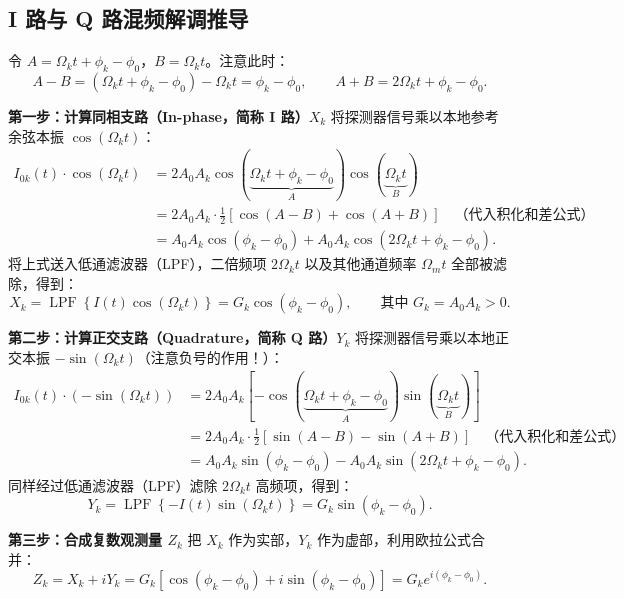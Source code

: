 \documentclass[UTF8, a4paper, 11pt]{ctexart}
\begin{document}
\subsection{I 路与 Q 路混频解调推导}

\begin{derivation}[从混频乘法到复观测量 $Z_k = X_k + iY_k$]
令 $A = \Omega_k t + \phi_k - \phi_0$，$B = \Omega_k t$。注意此时：
\[
    A - B = (\Omega_k t + \phi_k - \phi_0) - \Omega_k t = \phi_k - \phi_0, \qquad A + B = 2\Omega_k t + \phi_k - \phi_0.
\]

\textbf{第一步：计算同相支路（In-phase，简称 I 路）$X_k$}
将探测器信号乘以本地参考余弦本振 $\cos(\Omega_k t)$：
\begin{align*}
    I_{0k}(t) \cdot \cos(\Omega_k t) &= 2A_0 A_k \cos(\underbrace{\Omega_k t + \phi_k - \phi_0}_{A}) \cos(\underbrace{\Omega_k t}_{B}) \\
    &= 2A_0 A_k \cdot \frac{1}{2}\left[ \cos(A - B) + \cos(A + B) \right] \quad \text{（代入积化和差公式）}\\
    &= A_0 A_k \cos(\phi_k - \phi_0) + A_0 A_k \cos(2\Omega_k t + \phi_k - \phi_0).
\end{align*}
将上式送入低通滤波器（LPF），二倍频项 $2\Omega_k t$ 以及其他通道频率 $\Omega_m t$ 全部被滤除，得到：
\[
    X_k = \operatorname{LPF}\left\{ I(t)\cos(\Omega_k t) \right\} = G_k \cos(\phi_k - \phi_0), \qquad \text{其中 } G_k = A_0 A_k > 0.
\]

\textbf{第二步：计算正交支路（Quadrature，简称 Q 路）$Y_k$}
将探测器信号乘以本地正交本振 $-\sin(\Omega_k t)$（注意负号的作用！）：
\begin{align*}
    I_{0k}(t) \cdot \left(-\sin(\Omega_k t)\right) &= 2A_0 A_k \left[ -\cos(\underbrace{\Omega_k t + \phi_k - \phi_0}_{A}) \sin(\underbrace{\Omega_k t}_{B}) \right] \\
    &= 2A_0 A_k \cdot \frac{1}{2}\left[ \sin(A - B) - \sin(A + B) \right] \quad \text{（代入积化和差公式）}\\
    &= A_0 A_k \sin(\phi_k - \phi_0) - A_0 A_k \sin(2\Omega_k t + \phi_k - \phi_0).
\end{align*}
同样经过低通滤波器（LPF）滤除 $2\Omega_k t$ 高频项，得到：
\[
    Y_k = \operatorname{LPF}\left\{ -I(t)\sin(\Omega_k t) \right\} = G_k \sin(\phi_k - \phi_0).
\]

\textbf{第三步：合成复数观测量 $Z_k$}
把 $X_k$ 作为实部，$Y_k$ 作为虚部，利用欧拉公式合并：
\[
    \boxed{
    Z_k = X_k + iY_k = G_k\left[\cos(\phi_k - \phi_0) + i\sin(\phi_k - \phi_0)\right] = G_k e^{i(\phi_k - \phi_0)}.
    }
\]
\end{derivation}
\end{document}
